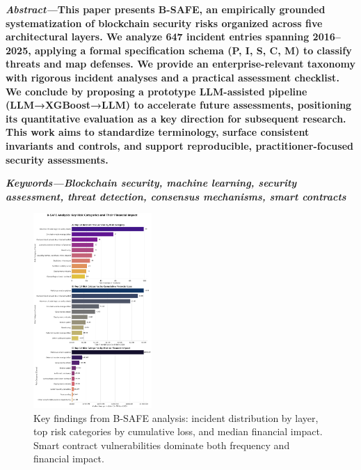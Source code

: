 \documentclass[a4paper]{article}
\begin{document}
\begin{multicols}{2}
\setlength{\columnsep}{0.5cm}


\noindent \textbf{\textit{Abstract---}This paper presents B-SAFE, an empirically grounded systematization of blockchain security risks organized across five architectural layers. We analyze 647 incident entries spanning 2016--2025, applying a formal specification schema (P, I, S, C, M) to classify threats and map defenses. We provide an enterprise-relevant taxonomy with rigorous incident analyses and a practical assessment checklist. We conclude by proposing a prototype LLM-assisted pipeline (LLM→XGBoost→LLM) to accelerate future assessments, positioning its quantitative evaluation as a key direction for subsequent research. This work aims to standardize terminology, surface consistent invariants and controls, and support reproducible, practitioner-focused security assessments.}

\small	
\noindent \textbf{\textit{Keywords---}\textit{Blockchain security, machine learning, security assessment, threat detection, consensus mechanisms, smart contracts}}

\begin{figure}[H]
\centering
\includegraphics[width=0.4\textwidth]{../figure/fig1.png}
\caption{Key findings from B-SAFE analysis: incident distribution by layer, top risk categories by cumulative loss, and median financial impact. Smart contract vulnerabilities dominate both frequency and financial impact.}
\label{fig:key_results}
\end{figure}





\end{multicols}
\end{document}
